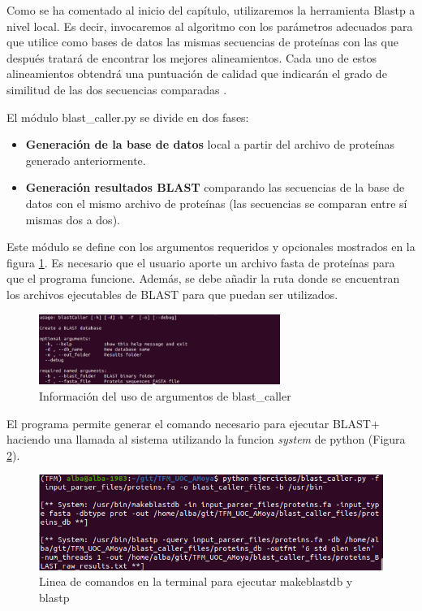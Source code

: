 Como se ha comentado al inicio del capítulo, utilizaremos la herramienta Blastp a nivel local. Es decir, invocaremos al algoritmo con los parámetros adecuados para que utilice como bases de datos las mismas secuencias de proteínas con las que después tratará de encontrar los mejores alineamientos. Cada uno de estos alineamientos obtendrá una puntuación de calidad que indicarán el grado de similitud de las dos secuencias comparadas \cite{madden_blast_2003, altschul_basic_1990}.

El módulo blast\_caller.py se divide en dos fases:

\begin{itemize}
\item \textbf {Generación de la base de datos} local a partir del archivo de proteínas generado anteriormente.
\item \textbf {Generación resultados BLAST} comparando las secuencias de la base de datos con el mismo archivo de proteínas (las secuencias se comparan entre sí mismas dos a dos).
\end{itemize}

Este módulo se define con los argumentos requeridos y opcionales mostrados en la figura \ref{fig:usage_blast_caller}. Es necesario que el usuario aporte un archivo fasta de proteínas para que el programa funcione. Además, se debe añadir la ruta donde se encuentran los archivos ejecutables de BLAST para que puedan ser utilizados.

\begin{figure}[h]
\centering
    \includegraphics[width=0.7\textwidth]{figs/usage_blast_caller.png}
    \caption[Información de blast\_caller en la terminal]{Información del uso de argumentos de blast\_caller}
    \label{fig:usage_blast_caller}
\end{figure}

El programa permite generar el comando necesario para ejecutar BLAST+ haciendo una llamada al sistema utilizando la funcion \textit{system} de python (Figura \ref{fig:blast_caller}).

\begin{figure}[h]
	\centering
	\captionsetup{width=0.7\linewidth} 
	\includegraphics[width=0.7\linewidth]{figs/blast_caller.png}
	\caption[Linea de comandos blast]{Linea de comandos en la terminal para ejecutar makeblastdb y blastp}
	\label{fig:blast_caller}
\end{figure}

